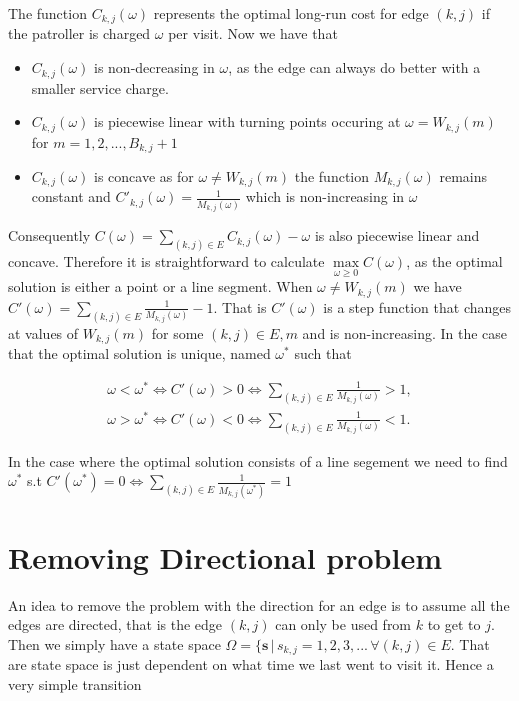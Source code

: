 \documentclass[a4paper,10pt]{article}
\theoremstyle{definition}
\theoremstyle{definition}
\theoremstyle{remark}
\theoremstyle{definition}
\begin{document}
The function $C_{k,j}(\omega)$ represents the optimal long-run cost for edge $(k,j)$ if the patroller is charged $\omega$ per visit. Now we have that
\begin{itemize}
\item $C_{k,j}(\omega)$ is non-decreasing in $\omega$, as the edge can always do better with a smaller service charge.
\item $C_{k,j}(\omega)$ is piecewise linear with turning points occuring at $\omega=W_{k,j}(m)$ for $m=1,2,...,B_{k,j}+1$
\item $C_{k,j}(\omega)$ is concave as for $\omega \neq W_{k,j}(m)$ the function $M_{k,j}(\omega)$ remains constant and $C'_{k,j}(\omega)=\frac{1}{M_{k,j}(\omega)}$ which is non-increasing in $\omega$
\end{itemize}

Consequently $C(\omega)=\sum\limits_{(k,j) \in E} C_{k,j}(\omega) - \omega$ is also piecewise linear and concave. Therefore it is straightforward to calculate $\max\limits_{\omega \geq 0} C(\omega)$, as the optimal solution is either a point or a line segment. When $\omega \neq W_{k,j}(m)$ we have $C'(\omega)=\sum\limits_{(k,j) \in E} \frac{1}{M_{k,j}(\omega)} - 1$. That is $C'(\omega)$ is a step function that changes at values of $W_{k,j}(m)$ for some $(k,j) \in E , m$ and is non-increasing. In the case that the optimal solution is unique, named $\omega^{*}$ such that

\begin{align*}
\omega < \omega^{*} \iff C'(\omega) > 0 \iff \sum\limits_{(k,j) \in E} \frac{1}{M_{k,j}(\omega)} > 1 ,\\
\omega > \omega^{*} \iff C'(\omega) < 0 \iff \sum\limits_{(k,j) \in E} \frac{1}{M_{k,j}(\omega)} < 1 .
\end{align*}

In the case where the optimal solution consists of a line segement we need to find $\omega^{*}$ s.t $C'(\omega^{*})=0 \iff \sum\limits_{(k,j) \in E} \frac{1}{M_{k,j}(\omega^{*})} = 1$

\section{Removing Directional problem}
An idea to remove the problem with the direction for an edge is to assume all the edges are directed, that is the edge $(k,j)$ can only be used from $k$ to get to $j$. Then we simply have a state space $\Omega= \{ \bm{s} \, | \, s_{k,j}=1,2,3,... \, \forall (k,j) \in E $. That are state space is just dependent on what time we last went to visit it. Hence a very simple transition
\end{document}
